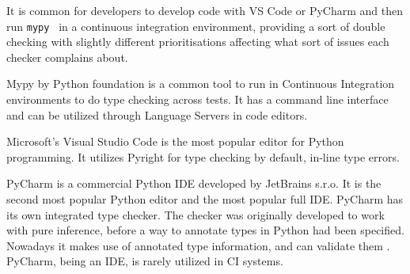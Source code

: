 It is common for developers to develop code with VS Code or PyCharm and then run {\tt mypy } in a continuous integration environment, providing a sort of double checking with slightly different prioritisations affecting what sort of issues each checker complains about.


Mypy by Python foundation is a common tool to run in Continuous Integration environments to do type checking across tests. It has a command line interface and can be utilized through Language Servers in code editors. 

Microsoft's Visual Studio Code is the most popular editor for Python programming\cite{python_software_foundation_jetbrains_sro_python_nodate}. It utilizes Pyright for type checking by default, in-line type errors.

PyCharm is a commercial Python IDE developed by JetBrains s.r.o. It is the second most popular Python editor and the most popular full IDE. PyCharm has its own integrated type checker. The checker was originally developed to work with pure inference, before a way to annotate types in Python had been specified. Nowadays it makes use of annotated type information, and can validate them \cite{jetbrains_type_hinting_pycharm}. PyCharm, being an IDE, is rarely utilized in CI systems. 